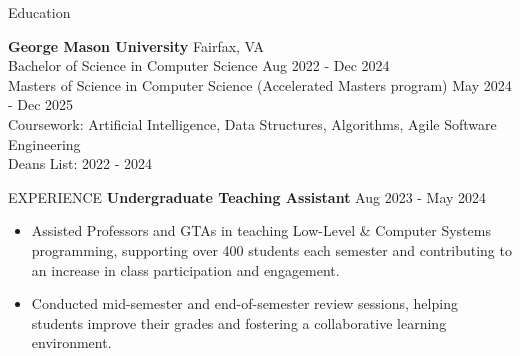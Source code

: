 \documentclass{resume} %
\begin{document}
\vspace{-0.5em}
\begin{rSection}{Education}

{\bf George Mason University} \hfill {Fairfax, VA}\\
Bachelor of Science in Computer Science \hfill{Aug 2022 - Dec 2024}\\
Masters of Science in Computer Science (Accelerated Masters program) \hfill{May 2024 - Dec 2025}\\
Coursework: Artificial Intelligence, Data Structures, Algorithms, Agile Software Engineering\\
Deans List: 2022 - 2024
\end{rSection}

\begin{rSection}{EXPERIENCE}
\textbf{Undergraduate Teaching Assistant} \hfill Aug 2023 - May 2024
 \begin{itemize}
    \itemsep -3pt {}
     \item Assisted Professors and GTAs in teaching Low-Level \& Computer Systems programming, supporting over 400 students each semester and contributing to an increase in class participation and engagement.
     \item Conducted mid-semester and end-of-semester review sessions, helping students improve their grades and fostering a collaborative learning environment.
 \end{itemize}
\end{rSection} 
\end{document}

